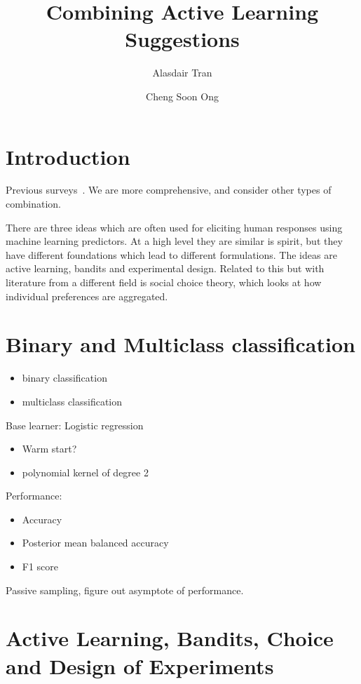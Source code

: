 \documentclass[fleqn,10pt,lineno]{wlpeerj} %
\title{Combining Active Learning Suggestions}
\author[1]{Alasdair Tran}
\author[2]{Cheng Soon Ong}
\affil[1]{is it ok to put ANU here?}
\affil[2]{Machine Learning Research Group, Data61, CSIRO, Australia}
\begin{document}
\flushbottom
\maketitle
\thispagestyle{empty}

\section*{Introduction}


Previous surveys~\cite{baram04onlcal,hsu15actll}. We are more comprehensive, and consider other types of combination.

There are three ideas which are often used for eliciting human
responses using machine learning predictors. At a high level they are
similar is spirit, but they have different foundations which lead to
different formulations. The ideas are active learning, bandits and
experimental design. Related to this but with literature from a different field is social choice theory, which looks at how individual preferences are aggregated.



\section*{Binary and Multiclass classification}

\begin{itemize}
  \item binary classification
  \item multiclass classification
\end{itemize}

Base learner: Logistic regression
\begin{itemize}
  \item Warm start?
  \item polynomial kernel of degree 2
\end{itemize}

Performance:
\begin{itemize}
  \item Accuracy
  \item Posterior mean balanced accuracy
  \item F1 score
\end{itemize}

Passive sampling, figure out asymptote of performance.


\section*{Active Learning, Bandits, Choice and Design of Experiments}
\end{document}

